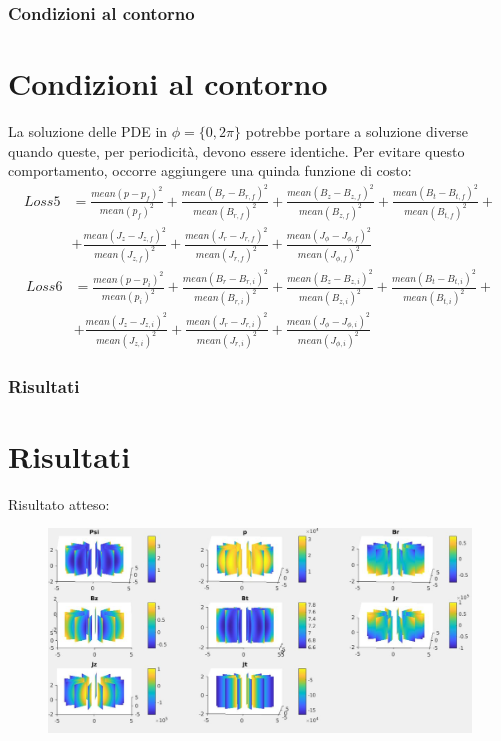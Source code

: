 \documentclass{beamer}
\begin{document}
\begin{frame}
	\frametitle{Condizioni al contorno}
	\section{Condizioni al contorno}
	La soluzione delle PDE in \(\phi = \{ 0,2\pi \} \) potrebbe portare a soluzione diverse quando queste, per periodicità, devono essere identiche. Per evitare questo comportamento, occorre aggiungere una quinda funzione di costo:\scriptsize\begin{align*}
		Loss5 &= \frac{mean{(p-p_{f})}^{2}}{mean{(p_{f})}^{2}}+\frac{mean{(B_{r}-B_{r,f})}^{2}}{mean{(B_{r,f})}^{2}}+\frac{mean{(B_{z}-B_{z,f})}^{2}}{mean{(B_{z,f})}^{2}}+\frac{mean{(B_{t}-B_{t,f})}^{2}}{mean{(B_{t,f})}^{2}}+\\
		&+\frac{{mean(J_{z}-J_{z,f})}^{2}
		}{{mean(J_{z,f})}^{2}
		}+\frac{{mean(J_{r}-J_{r,f})}^{2}
		}{{mean(J_{r,f})}^{2}}+\frac{{mean(J_{\phi}-J_{\phi ,f})}^{2}
		}{{mean(J_{\phi ,f})}^{2}}
	\end{align*}
	\begin{align*}
		Loss6 &= \frac{mean{(p-p_{i})}^{2}}{mean{(p_{i})}^{2}}+\frac{mean{(B_{r}-B_{r,i})}^{2}}{mean{(B_{r,i})}^{2}}+\frac{mean{(B_{z}-B_{z,i})}^{2}}{mean{(B_{z,i})}^{2}}+\frac{mean{(B_{t}-B_{t,i})}^{2}}{mean{(B_{t,i})}^{2}}+\\
		&+\frac{{mean(J_{z}-J_{z,i})}^{2}
		}{{mean(J_{z,i})}^{2}
		}+\frac{{mean(J_{r}-J_{r,i})}^{2}
		}{{mean(J_{r,i})}^{2}}+\frac{{mean(J_{\phi}-J_{\phi ,i})}^{2}
		}{{mean(J_{\phi ,i})}^{2}}
	\end{align*}
\end{frame}
\begin{frame}
	\frametitle{Risultati}
	\section{Risultati}
		Risultato atteso:
		\begin{figure}
			\includegraphics[scale=0.3]{2022-06-20-23-05-27.png}%
		\end{figure}
\end{frame}
\end{document}
